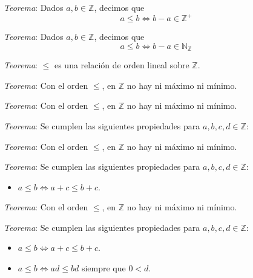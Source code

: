 \documentclass{beamer}
\begin{document}
  \begin{frame}
    \textit{Teorema}: Dados $a, b \in \mathbb{Z}$, decimos que 
    \[a \leq b \iff b - a \in \mathbb{Z}^+\]
  \end{frame}

  \begin{frame}
    \textit{Teorema}: Dados $a, b \in \mathbb{Z}$, decimos que 
    \[a \leq b \iff b - a \in \mathbb{N}_\mathbb{Z}\]
    \newline\newline

    \textit{Teorema}: $\leq$ es una relación de orden lineal sobre $\mathbb{Z}$.
  \end{frame}

  \begin{frame}
    \textit{Teorema}: Con el orden $\leq$, en $\mathbb{Z}$ no hay ni máximo ni 
    mínimo.
  \end{frame}

  \begin{frame}
    \textit{Teorema}: Con el orden $\leq$, en $\mathbb{Z}$ no hay ni máximo ni 
    mínimo.
    \newline\newline

    \textit{Teorema}: Se cumplen las siguientes propiedades para $a, b, c, d \in \mathbb{Z}$:
  \end{frame}

  \begin{frame}
    \textit{Teorema}: Con el orden $\leq$, en $\mathbb{Z}$ no hay ni máximo ni 
    mínimo.
    \newline\newline

    \textit{Teorema}: Se cumplen las siguientes propiedades para $a, b, c, d \in \mathbb{Z}$:
    \begin{itemize}
      \item $a \leq b \iff a + c \leq b + c$.
    \end{itemize}
  \end{frame}

  \begin{frame}
    \textit{Teorema}: Con el orden $\leq$, en $\mathbb{Z}$ no hay ni máximo ni 
    mínimo.
    \newline\newline

    \textit{Teorema}: Se cumplen las siguientes propiedades para $a, b, c, d \in \mathbb{Z}$:
    \begin{itemize}
      \item $a \leq b \iff a + c \leq b + c$.
      \item $a \leq b \iff ad \leq bd$ siempre que $0 < d$.
    \end{itemize}
  \end{frame}
\end{document}

